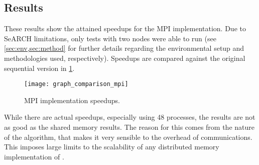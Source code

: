 \subsection{Results}
\label{sec:mpi:results}

These results show the attained speedups for the MPI implementation.
Due to SeARCH limitations, only tests with two nodes were able to run (see \cref{sec:env,sec:method} for further details regarding the environmental setup and methodologies used, respectively).
Speedups are compared against the original sequential version in \cref{fig:mpi:results}.

\begin{figure}[!htp]
	\centering
	\texttt{[image: graph\_comparison\_mpi]}
	\caption{MPI implementation speedups.}
	\label{fig:mpi:results}
\end{figure}

While there are actual speedups, especially using 48 processes, the results are not as good as the shared memory results.
The reason for this comes from the nature of the algorithm, that makes it very sensible to the overhead of communications.
This imposes large limits to the scalability of any distributed memory implementation of \polu.
